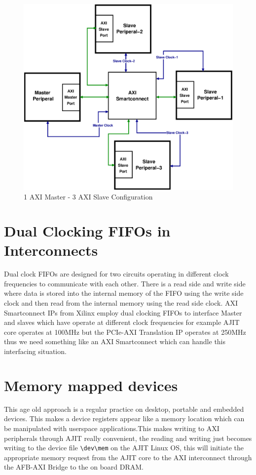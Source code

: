 \begin{figure}[H]
\centering
\includegraphics[width=\textwidth]{eps_pdf_sources/ajit_fpga/System_Level/One_Master_Multi_Slave}
\caption{1 AXI Master - 3 AXI Slave Configuration}
\end{figure}

\section{Dual Clocking FIFOs in Interconnects}

Dual clock FIFOs are designed for two circuits operating in different clock frequencies to communicate with each other. There is a read side
and write side where data is stored into the internal memory of the FIFO using the write side clock and then read from the internal memory
using the read side clock. AXI Smartconnect IPs from Xilinx employ dual clocking FIFOs to interface Master and slaves which have operate at
different clock frequencies for example AJIT core operates at 100MHz but the PCIe-AXI Translation IP operates at 250MHz thus we need
something like an AXI Smartconnect which can handle this interfacing situation.\\

\section{Memory mapped devices}

This age old approach is a regular practice on desktop, portable and embedded devices. This makes a device registers appear like a memory
location which can be manipulated with userspace applications.This makes writing to AXI peripherals through AJIT really convenient, the
reading and writing just becomes writing to the device file \verb|\dev\mem| on the AJIT Linux OS, this will initiate the appropriate memory
request from the AJIT core to the AXI interconnect through the AFB-AXI Bridge to the on board DRAM.

